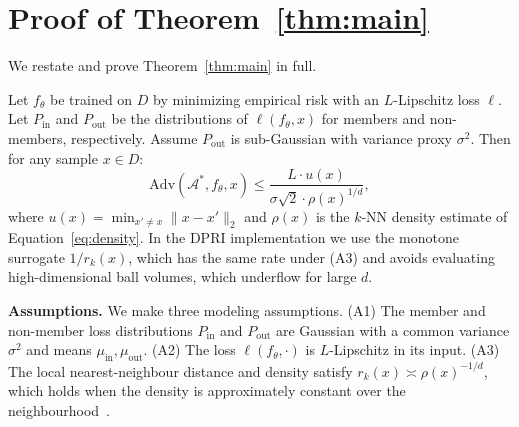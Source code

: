 \section{Proof of Theorem~\ref{thm:main}}
\label{app:proofs}

We restate and prove Theorem~\ref{thm:main} in full.

\begin{theorem}
Let $f_\theta$ be trained on $D$ by minimizing empirical risk with an
$L$-Lipschitz loss $\ell$.
Let $P_{\mathrm{in}}$ and $P_{\mathrm{out}}$ be the distributions of
$\ell(f_\theta, x)$ for members and non-members, respectively.
Assume $P_{\mathrm{out}}$ is sub-Gaussian with variance proxy $\sigma^2$.
Then for any sample $x \in D$:
\begin{equation}
  \mathrm{Adv}(\mathcal{A}^*, f_\theta, x)
  \leq
  \frac{L \cdot u(x)}{\sigma \sqrt{2} \cdot \rho(x)^{1/d}},
  \label{eq:bound_app}
\end{equation}
where $u(x) = \min_{x' \neq x} \|x - x'\|_2$ and
$\rho(x)$ is the $k$-NN density estimate of
Equation~\eqref{eq:density}. In the DPRI implementation we use the
monotone surrogate $1/r_k(x)$, which has the same rate under (A3) and
avoids evaluating high-dimensional ball volumes, which underflow for
large $d$.
\end{theorem}

\noindent\textbf{Assumptions.} We make three modeling assumptions. (A1) The
member and non-member loss distributions $P_{\mathrm{in}}$ and
$P_{\mathrm{out}}$ are Gaussian with a common variance $\sigma^2$ and means
$\mu_{\mathrm{in}}, \mu_{\mathrm{out}}$. (A2) The loss $\ell(f_\theta,\cdot)$
is $L$-Lipschitz in its input. (A3) The local nearest-neighbour distance and
density satisfy $r_k(x) \asymp \rho(x)^{-1/d}$, which holds when the density
is approximately constant over the neighbourhood~\cite{biau2015lectures}.

